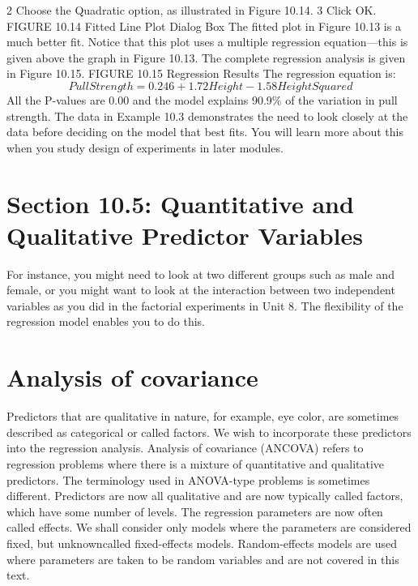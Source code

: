 \documentclass[]{report}
\begin{document}
2 Choose the Quadratic option, as illustrated in Figure 10.14.
3 Click OK.
FIGURE 10.14 Fitted Line Plot Dialog Box
The fitted plot in Figure 10.13 is a much better fit. Notice that this plot uses a multiple
regression equation—this is given above the graph in Figure 10.13.
The complete regression analysis is given in Figure 10.15.
FIGURE 10.15 Regression Results
The regression equation is:
\[Pull Strength = 0.246 + 1.72 Height - 1.58 Height Squared\]
All the P-values are 0.00 and the model explains 90.9\% of the variation in pull strength.
The data in Example 10.3 demonstrates the need to look closely at the data before
deciding on the model that best fits. You will learn more about this when you study
design of experiments in later modules.
\section{Section 10.5: Quantitative and Qualitative Predictor Variables}
For instance, you might need to look at two different groups such as male and female,
or you might want to look at the interaction between two independent variables as
you did in the factorial experiments in Unit 8. The flexibility of the regression model
enables you to do this.
\newpage
\section*{Analysis of covariance}
Predictors that are qualitative in nature, for example, eye color, are sometimes described as categorical or
called factors. We wish to incorporate these predictors into the regression analysis. Analysis of covariance
(ANCOVA) refers to regression problems where there is a mixture of quantitative and qualitative predictors.
The terminology used in ANOVA-type problems is sometimes different. Predictors are now all qualitative
and are now typically called factors, which have some number of levels. The regression parameters are now often
called effects. We shall consider only models where the parameters are considered fixed, but unknowncalled
fixed-effects models. Random-effects models are used where parameters are taken to be random variables and
are not covered in this text.
\newpage

\end{document}
